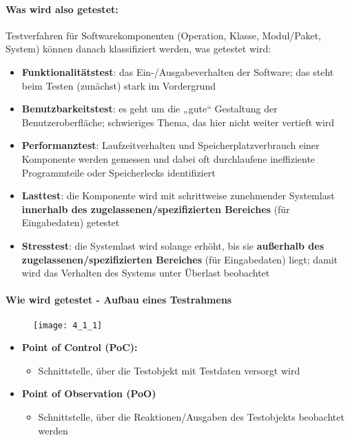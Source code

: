 \paragraph{Was wird also getestet:}
Testverfahren für Softwarekomponenten (Operation, Klasse, Modul/Paket, System) können danach klassifiziert werden, was getestet wird:
\begin{itemize}
	\item \textbf{Funktionalitätstest}: das Ein-/Ausgabeverhalten der Software; das steht beim Testen (zunächst) stark im Vordergrund
	\item \textbf{Benutzbarkeitstest}: es geht um die „gute“ Gestaltung der Benutzeroberfläche; schwieriges Thema, das hier nicht weiter vertieft wird
	\item \textbf{Performanztest}: Laufzeitverhalten und Speicherplatzverbrauch einer Komponente werden gemessen und dabei oft durchlaufene ineffiziente Programmteile oder Speicherlecks identifiziert
	\item \textbf{Lasttest}: die Komponente wird mit schrittweise zunehmender Systemlast \textbf{innerhalb des zugelassenen/spezifizierten Bereiches} (für Eingabedaten) getestet  
	\item \textbf{Stresstest}: die Systemlast wird solange erhöht, bis sie \textbf{außerhalb des zugelassenen/spezifizierten Bereiches} (für Eingabedaten) liegt; damit wird das Verhalten 
	des Systems unter Überlast beobachtet
\end{itemize}

\paragraph{Wie wird getestet - Aufbau eines Testrahmens}

\begin{figure}[h]
	\centering
	\texttt{[image: 4\_1\_1]}
\end{figure}

\begin{itemize}
	\item \textbf{Point of Control (PoC): }
	\begin{itemize}
		\item Schnittstelle, über die Testobjekt mit Testdaten versorgt wird
	\end{itemize}
	\item \textbf{Point of Observation (PoO)}
	\begin{itemize}
		\item Schnittstelle, über die Reaktionen/Ausgaben des Testobjekts beobachtet werden
	\end{itemize}
\end{itemize}

